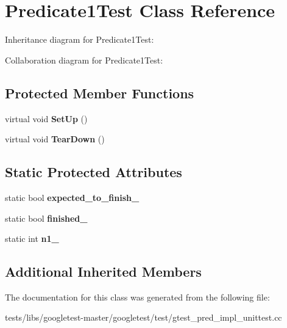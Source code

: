 \hypertarget{classPredicate1Test}{}\section{Predicate1\+Test Class Reference}
\label{classPredicate1Test}


Inheritance diagram for Predicate1\+Test\+:


Collaboration diagram for Predicate1\+Test\+:
\subsection*{Protected Member Functions}
\begin{DoxyCompactItemize}
\item 
\mbox{\label{classPredicate1Test_a481704a09f73a37158513f9a336dbdd9}} 
virtual void {\bfseries Set\+Up} ()
\item 
\mbox{\label{classPredicate1Test_ad2974af5c6abc508847c3a9912b24a90}} 
virtual void {\bfseries Tear\+Down} ()
\end{DoxyCompactItemize}
\subsection*{Static Protected Attributes}
\begin{DoxyCompactItemize}
\item 
\mbox{\label{classPredicate1Test_ad91cfa58e6352d53abacce32df2ef635}} 
static bool {\bfseries expected\+\_\+to\+\_\+finish\+\_\+}
\item 
\mbox{\label{classPredicate1Test_a6d45fb2d1f01a5c8baf28f60039c244e}} 
static bool {\bfseries finished\+\_\+}
\item 
\mbox{\label{classPredicate1Test_a528d9f7f618b17802962a3824eea11e3}} 
static int {\bfseries n1\+\_\+}
\end{DoxyCompactItemize}
\subsection*{Additional Inherited Members}


The documentation for this class was generated from the following file\+:\begin{DoxyCompactItemize}
\item 
tests/libs/googletest-\/master/googletest/test/gtest\+\_\+pred\+\_\+impl\+\_\+unittest.\+cc\end{DoxyCompactItemize}
